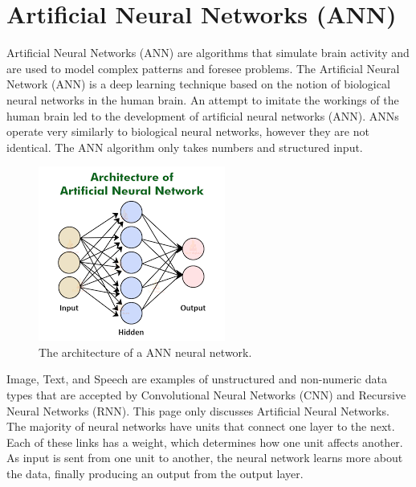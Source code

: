 \section{Artificial Neural Networks (ANN)}
Artificial Neural Networks (ANN) are algorithms that simulate brain activity and are used to model complex patterns and foresee problems. The Artificial Neural Network (ANN) is a deep learning technique based on the notion of biological neural networks in the human brain. An attempt to imitate the workings of the human brain led to the development of artificial neural networks (ANN). ANNs operate very similarly to biological neural networks, however they are not identical. The ANN algorithm only takes numbers and structured input.

\begin{figure}[ht]
    \centering
    \includegraphics[scale=1.0]{figures/ANN.png}
    \caption{The architecture of a ANN neural network.}
    \label{fig:chart_a}
\end{figure}

Image, Text, and Speech are examples of unstructured and non-numeric data types that are accepted by Convolutional Neural Networks (CNN) and Recursive Neural Networks (RNN). This page only discusses Artificial Neural Networks. The majority of neural networks have units that connect one layer to the next. Each of these links has a weight, which determines how one unit affects another. As input is sent from one unit to another, the neural network learns more about the data, finally producing an output from the output layer. 










